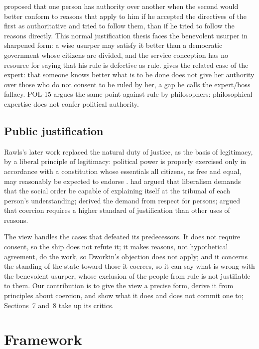 \documentclass{situationist-preprint}
\begin{document}
\citet[chs.~2--4]{Raz1986} proposed that one person has authority over another when the second would better conform to reasons that apply to him if he accepted the directives of the first as authoritative and tried to follow them, than if he tried to follow the reasons directly. This normal justification thesis faces the benevolent usurper in sharpened form: a wise usurper may satisfy it better than a democratic government whose citizens are divided, and the service conception has no resource for saying that his rule is defective as rule. \citet{Estlund2008} gives the related case of the expert: that someone knows better what is to be done does not give her authority over those who do not consent to be ruled by her, a gap he calls the expert/boss fallacy. POL-15 argues the same point against rule by philosophers: philosophical expertise does not confer political authority.

\subsection{Public justification}

Rawls's later work replaced the natural duty of justice, as the basis of legitimacy, by a liberal principle of legitimacy: political power is properly exercised only in accordance with a constitution whose essentials all citizens, as free and equal, may reasonably be expected to endorse \citep{Rawls1993}. \citet{Waldron1987} had argued that liberalism demands that the social order be capable of explaining itself at the tribunal of each person's understanding; \citet{Larmore1999} derived the demand from respect for persons; \citet{Nagel1991} argued that coercion requires a higher standard of justification than other uses of reasons.

The view handles the cases that defeated its predecessors. It does not require consent, so the ship does not refute it; it makes reasons, not hypothetical agreement, do the work, so Dworkin's objection does not apply; and it concerns the standing of the state toward those it coerces, so it can say what is wrong with the benevolent usurper, whose exclusion of the people from rule is not justifiable to them. Our contribution is to give the view a precise form, derive it from principles about coercion, and show what it does and does not commit one to; Sections~7 and~8 take up its critics.

\section{Framework}
\end{document}
